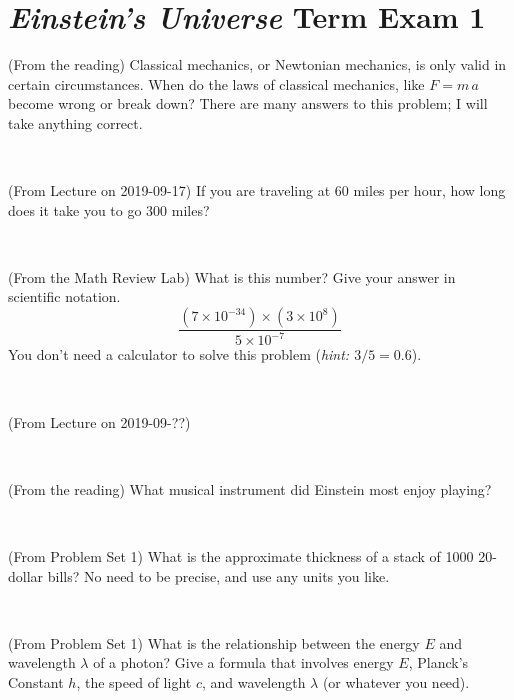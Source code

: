 \documentclass[12pt, letterpaper]{article}
\begin{document}
\section*{\textsl{Einstein's Universe} Term Exam 1}
\setcounter{problem}{1}


\begin{problem} (From the reading)
Classical mechanics, or Newtonian mechanics, is only valid in certain
circumstances. When do the laws of classical mechanics, like $F =
m\,a$ become wrong or break down? There are many answers to this
problem; I will take anything correct.
\end{problem}


\vfill ~

\begin{problem} (From Lecture on 2019-09-17)
If you are traveling at 60 miles per hour, how long does
it take you to go 300 miles?
\end{problem}


\vfill ~

\begin{problem} (From the Math Review Lab)
What is this number? Give your answer in scientific notation.
$$
\frac{(7\times10^{-34})\times(3\times10^8)}{5\times10^{-7}}
$$
You don't need a calculator to solve this problem (\textit{hint: $3/5=0.6$}).
\end{problem}


\vfill ~

\begin{problem} (From Lecture on 2019-09-??)
\end{problem}


\vfill ~


\clearpage


\begin{problem} (From the reading)
What musical instrument did Einstein most enjoy playing?
\end{problem}


\vfill ~

\begin{problem} (From Problem Set 1)
What is the approximate thickness of a stack of 1000 20-dollar bills?
No need to be precise, and use any units you like.
\end{problem}


\vfill ~

\begin{problem} (From Problem Set 1)
What is the relationship between the energy $E$ and wavelength
$\lambda$ of a photon? Give a formula that involves energy $E$,
Planck's Constant $h$, the speed of light $c$, and wavelength
$\lambda$ (or whatever you need).
\end{problem}
\end{document}

